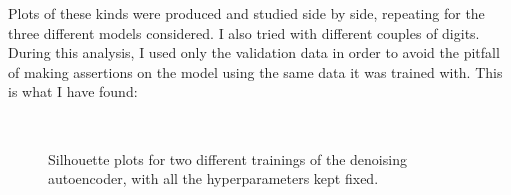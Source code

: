 \documentclass[twocolumn,gsifonts,twoside]{gsipaper}
\begin{document}
Plots of these kinds were produced and studied side by side, repeating for the three different models considered. I also tried with different couples of digits. During this analysis, I used only the validation data in order to avoid the pitfall of making assertions on the model using the same data it was trained with.
 This is what I have found:
\begin{figure}[htb]
  \\
  \caption{Silhouette plots for two different trainings of the denoising autoencoder, with all the hyperparameters kept fixed.}
  \label{fig:s_score}
\end{figure}
\end{document}
